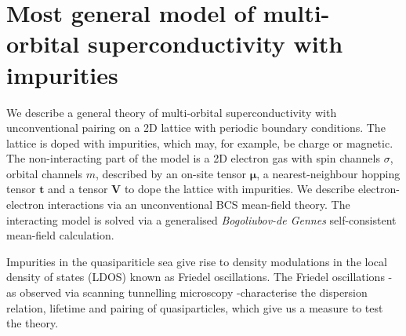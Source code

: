 \chapter{\label{ch:QCA_intro}Most general model of multi-orbital superconductivity with impurities}


\label{sec:most_general_model}
We describe a general theory of multi-orbital superconductivity with unconventional pairing on a 2D lattice with periodic boundary conditions. The lattice is doped with impurities, which may, for example, be charge or magnetic. The non-interacting part of the model is a 2D electron gas with spin channels $\sigma$, orbital channels $m$, described by an on-site tensor $\bm{\mu}$, a nearest-neighbour hopping tensor $\bm{t}$ and a tensor $\bm{V}$ to dope the lattice with impurities. We describe electron-electron interactions via an unconventional BCS mean-field theory. The interacting model is solved via a generalised \textit{Bogoliubov-de Gennes} self-consistent mean-field calculation. 

Impurities in the quasipariticle sea give rise to density modulations in the local density of states (LDOS) known as Friedel oscillations. The Friedel oscillations -as observed via scanning tunnelling microscopy -characterise the dispersion relation, lifetime and pairing of quasiparticles, which give us a measure to test the theory.

